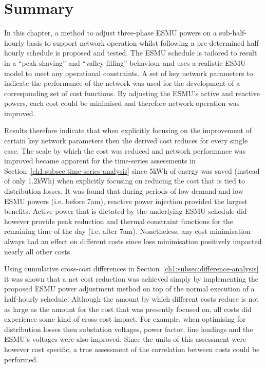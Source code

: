 \section{Summary}
\label{ch1:sec:summary}

In this chapter, a method to adjust three-phase ESMU powers on a sub-half-hourly basis to support network operation whilst following a pre-determined half-hourly schedule is proposed and tested.
The ESMU schedule is tailored to result in a ``peak-shaving'' and ``valley-filling'' behaviour and uses a realistic ESMU model to meet any operational constraints.
A set of key network parameters to indicate the performance of the network was used for the development of a corresponding set of cost functions.
By adjusting the ESMU's active and reactive powers, each cost could be minimised and therefore network operation was improved.

Results therefore indicate that when explicitly focusing on the improvement of certain key network parameters then the derived cost reduces for every single case.
The scale by which the cost was reduced and network performance was improved became apparent for the time-series assessments in Section~\ref{ch1:subsec:time-series-analysis} since  5kWh of energy was saved (instead of only 1.2kWh) when explicitly focusing on reducing the cost that is tied to distribution losses.
It was found that during periods of low demand and low ESMU powers (i.e. before 7am), reactive power injection provided the largest benefits.
Active power that is dictated by the underlying ESMU schedule did however provide peak reduction and thermal constraint functions for the remaining time of the day (i.e. after 7am).
Nonetheless, any cost minimisation always had an effect on different costs since  loss minimisation positively impacted nearly all other costs.

Using cumulative cross-cost differences in Section~\ref{ch1:subsec:difference-analysis} it was shown that a net cost reduction was achieved simply by implementing the proposed ESMU power adjustment method on top of the normal execution of a half-hourly schedule.
Although the amount by which different costs reduce is not as large as the amount for the cost that was presently focused on, all costs did experience some kind of cross-cost impact.
For example, when optimising for distribution losses then substation voltages, power factor, line loadings and the ESMU's voltages were also improved.
Since the units of this assessment were however cost specific, a true assessment of the correlation between costs could be performed.


